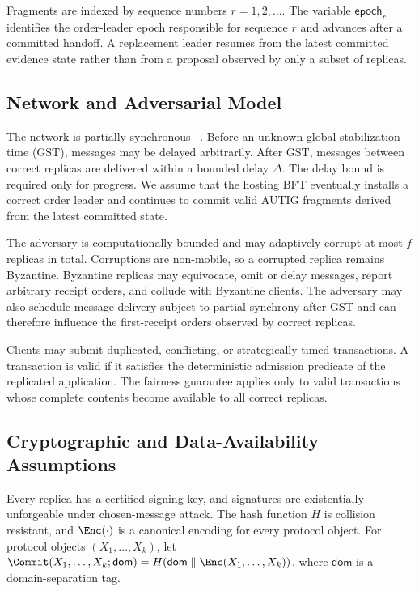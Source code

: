 Fragments are indexed by sequence numbers $r=1,2,\ldots$. The variable $\mathsf{epoch}_r$ identifies the order-leader epoch responsible for sequence $r$ and advances after a committed handoff. A replacement leader resumes from the latest committed evidence state rather than from a proposal observed by only a subset of replicas.


\subsection{Network and Adversarial Model}
\label{sec:network-adversary}

The network is partially synchronous ~\cite{dwork1988consensus}. Before an unknown global stabilization time (GST), messages may be delayed arbitrarily. After GST, messages between correct replicas are delivered within a bounded delay $\Delta$. The delay bound is required only for progress. We assume that the hosting BFT eventually installs a correct order leader and continues to commit valid AUTIG fragments derived from the latest committed state.

The adversary is computationally bounded and may adaptively corrupt at most $f$ replicas in total. Corruptions are non-mobile, so a corrupted replica remains Byzantine. Byzantine replicas may equivocate, omit or delay messages, report arbitrary receipt orders, and collude with Byzantine clients. The adversary may also schedule message delivery subject to partial synchrony after GST and can therefore influence the first-receipt orders observed by correct replicas.

Clients may submit duplicated, conflicting, or strategically timed transactions. A transaction is valid if it satisfies the deterministic admission predicate of the replicated application. The fairness guarantee applies only to valid transactions whose complete contents become available to all correct replicas.

\subsection{Cryptographic and Data-Availability Assumptions}
\label{sec:cryptographic-assumptions}

Every replica has a certified signing key, and signatures are existentially unforgeable under chosen-message attack. The hash function $H$ is collision resistant, and $\Enc(\cdot)$ is a canonical encoding for every protocol object. For protocol objects $(X_1,\ldots,X_k)$, let $\Commit(X_1,\ldots,X_k;\mathsf{dom})=H(\mathsf{dom}\parallel\Enc(X_1,\ldots,X_k))$, where $\mathsf{dom}$ is a domain-separation tag.

